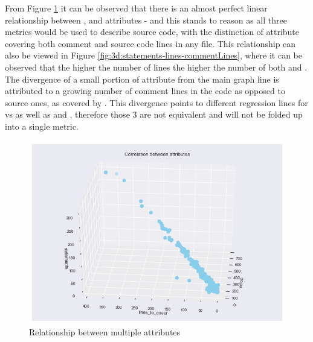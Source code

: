 \begin{enumerate}
From Figure \ref{fig:3d:ncloc-linesToCover-statements} it can be observed that there is an almost perfect linear relationship between \statements{}, \ncloc{} and \lines{} attributes - and this stands to reason as all three metrics would be used to describe source code, with the distinction of \lines{} attribute covering both comment and source code lines in any file. This relationship can also be viewed in Figure \ref{fig:3d:statements-lines-commentLines}, where it can be observed that the higher the number of lines the higher the number of both \statements{} and \commentLines{}. The divergence of a small portion of \lines{} attribute from the main graph line is attributed to a growing number of comment lines in the code as opposed to source ones, as covered by \statements{}. This divergence points to different regression lines for \lines{} vs \commentLines{} as well as \lines{} and \statements{}, therefore those 3 are not equivalent and will not be folded up into a single metric.
\begin{figure}[!h]
    \centering
    \includegraphics[scale=0.65]{Figures/three-d/Correlation-between-attributes-ncloc-lines_to_cover-statements.png}
    \caption{Relationship between multiple attributes}
    \label{fig:3d:ncloc-linesToCover-statements}
\end{figure}


\end{enumerate}
